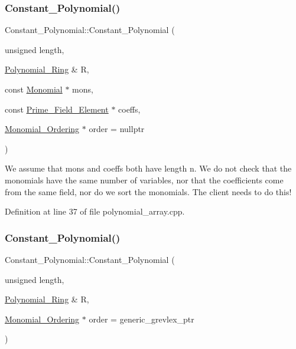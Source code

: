 \subsubsection{\texorpdfstring{Constant\+\_\+\+Polynomial()}{Constant\_Polynomial()}\hspace{0.1cm}{\footnotesize\ttfamily [1/2]}}
{\footnotesize\ttfamily Constant\+\_\+\+Polynomial\+::\+Constant\+\_\+\+Polynomial (\begin{DoxyParamCaption}\item[{unsigned}]{length,  }\item[{\hyperlink{class_polynomial___ring}{Polynomial\+\_\+\+Ring} \&}]{R,  }\item[{const \hyperlink{class_monomial}{Monomial} $\ast$}]{mons,  }\item[{const \hyperlink{class_prime___field___element}{Prime\+\_\+\+Field\+\_\+\+Element} $\ast$}]{coeffs,  }\item[{\hyperlink{class_monomial___ordering}{Monomial\+\_\+\+Ordering} $\ast$}]{order = {\ttfamily nullptr} }\end{DoxyParamCaption})}

We assume that mons and coeffs both have length n. We do not check that the monomials have the same number of variables, nor that the coefficients come from the same field, nor do we sort the monomials. The client needs to do this! 

Definition at line 37 of file polynomial\+\_\+array.\+cpp.

\mbox{\label{class_constant___polynomial_aeeb86875e964b91cb105f13d8fdf157b}} 
\subsubsection{\texorpdfstring{Constant\+\_\+\+Polynomial()}{Constant\_Polynomial()}\hspace{0.1cm}{\footnotesize\ttfamily [2/2]}}
{\footnotesize\ttfamily Constant\+\_\+\+Polynomial\+::\+Constant\+\_\+\+Polynomial (\begin{DoxyParamCaption}\item[{unsigned}]{length,  }\item[{\hyperlink{class_polynomial___ring}{Polynomial\+\_\+\+Ring} \&}]{R,  }\item[{\hyperlink{class_monomial___ordering}{Monomial\+\_\+\+Ordering} $\ast$}]{order = {\ttfamily generic\+\_\+grevlex\+\_\+ptr} }\end{DoxyParamCaption})}

